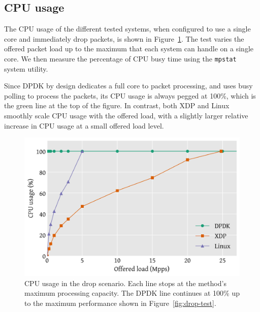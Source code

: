 \documentclass[10pt,sigconf]{acmart}
\begin{document}
\subsection{CPU usage}
\label{sec:cpu-usage}

The CPU usage of the different tested systems, when configured to use a single
core and immediately drop packets, is shown in Figure~\ref{fig:drop-cpu}. The
test varies the offered packet load up to the maximum that each system can
handle on a single core. We then measure the percentage of CPU busy time using
the \texttt{mpstat} system utility.

Since DPDK by design dedicates a full core to packet processing, and uses busy
polling to process the packets, its CPU usage is always pegged at 100\%, which
is the green line at the top of the figure. In contrast, both XDP and Linux
smoothly scale CPU usage with the offered load, with a slightly larger relative
increase in CPU usage at a small offered load level.

\begin{figure}[t]
\centering
\includegraphics[width=\linewidth]{figures/drop-cpu.pdf}
\caption{\label{fig:drop-cpu} CPU usage in the drop scenario. Each line stops at
  the method's maximum processing capacity. The DPDK line continues at 100\% up
  to the maximum performance shown in Figure~\ref{fig:drop-test}.}
\end{figure}
\end{document}

